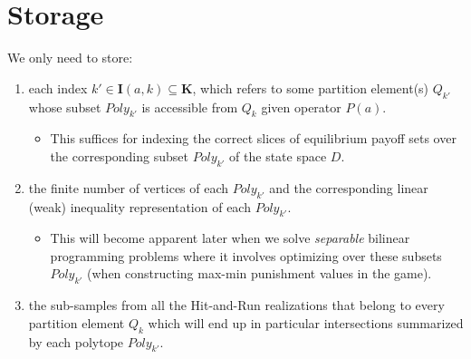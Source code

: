 \documentclass[a4paper,10pt,english]{sphinxmanual}
\begin{document}
\section{Storage}
\label{compute_statespace:storage}
We only need to store:
\begin{enumerate}
\item {} 
each index \(k' \in \mathbf{I}(a,k) \subseteq \mathbf{K}\), which refers to some partition element(s) \(Q_{k'}\) whose subset \(Poly_{k'}\) is accessible from \(Q_{k}\) given operator \(P(a)\).
\begin{itemize}
\item {} 
This suffices for indexing the correct slices of equilibrium payoff sets over the corresponding subset \(Poly_{k'}\) of the state space \(D\).

\end{itemize}

\item {} 
the finite number of vertices of each \(Poly_{k'}\) and the corresponding linear (weak) inequality representation of each \(Poly_{k'}\).
\begin{itemize}
\item {} 
This will become apparent later when we solve \emph{separable} bilinear programming problems where it involves optimizing over these subsets \(Poly_{k'}\) (when constructing max-min punishment values in the game).

\end{itemize}

\item {} 
the sub-samples from all the Hit-and-Run realizations that belong to every partition element
\(Q_k\) which will end up in particular intersections summarized by
each polytope \(Poly_{k'}\).

\end{enumerate}
\end{document}
